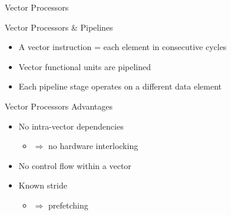 \documentclass[presentation]{beamer}
\begin{document}
\begin{frame}[label={sec:org64290e2}]{Vector Processors}
\begin{block}{Vector Processors \& Pipelines}
\begin{itemize}
\item A vector instruction = each element in consecutive cycles
\item Vector functional units are \alert{pipelined}
\item Each pipeline stage operates on a different data element
\end{itemize}
\end{block}
\begin{block}{Vector Processors Advantages}
\begin{itemize}
\item \alert{No} intra-vector \alert{dependencies}
\begin{itemize}
\item \(\Rightarrow\) no hardware interlocking
\end{itemize}
\item \alert{No control flow} within a vector
\item Known stride
\begin{itemize}
\item \(\Rightarrow\) \alert{prefetching}
\end{itemize}
\end{itemize}
\end{block}
\end{frame}
\end{document}
